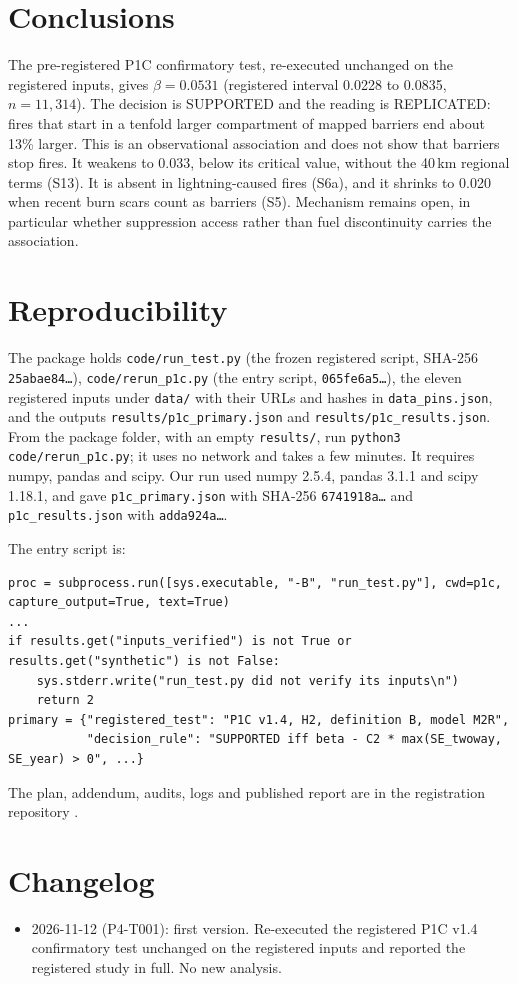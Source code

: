 \documentclass[11pt]{article}
\begin{document}
\section{Conclusions}
The pre-registered P1C confirmatory test, re-executed unchanged on the registered inputs, gives $\beta=0.0531$ (registered interval 0.0228 to 0.0835,
$n=11{,}314$). The decision is SUPPORTED and the reading is REPLICATED: fires that start in a tenfold larger compartment of mapped barriers end about 13\% larger.
This is an observational association and does not show that barriers stop fires. It weakens to 0.033, below its critical value, without the 40\,km
regional terms (S13). It is absent in lightning-caused fires (S6a), and it shrinks to 0.020 when recent burn scars count as barriers (S5).
Mechanism remains open, in particular whether suppression access rather than fuel discontinuity carries the association.

\section{Reproducibility}\label{sec:repro}
{\sloppy
The package holds \texttt{code/run\_test.py} (the frozen registered script, SHA-256 \texttt{25abae84\ldots}), \texttt{code/rerun\_p1c.py}
(the entry script, \texttt{065fe6a5\ldots}), the eleven registered inputs under \texttt{data/} with their URLs and hashes in \texttt{data\_pins.json},
and the outputs \texttt{results/p1c\_primary.json} and \texttt{results/p1c\_results.json}. From the package folder, with an empty \texttt{results/},
run \texttt{python3 code/rerun\_p1c.py}; it uses no network and takes a few minutes. It requires numpy, pandas and scipy. Our run used numpy 2.5.4, pandas 3.1.1 and scipy 1.18.1, and gave
\texttt{p1c\_primary.json} with SHA-256 \texttt{6741918a\ldots} and \texttt{p1c\_results.json} with \texttt{adda924a\ldots}.\par}
The entry script is:
\begin{lstlisting}
proc = subprocess.run([sys.executable, "-B", "run_test.py"], cwd=p1c, capture_output=True, text=True)
...
if results.get("inputs_verified") is not True or results.get("synthetic") is not False:
    sys.stderr.write("run_test.py did not verify its inputs\n")
    return 2
primary = {"registered_test": "P1C v1.4, H2, definition B, model M2R",
           "decision_rule": "SUPPORTED iff beta - C2 * max(SE_twoway, SE_year) > 0", ...}
\end{lstlisting}
The plan, addendum, audits, logs and published report are in the registration repository \citep{ViridisCanonPR138}.

\section*{Changelog}
\begin{itemize}
\item 2026-11-12 (P4-T001): first version. Re-executed the registered P1C v1.4 confirmatory test unchanged on the registered inputs and
  reported the registered study in full. No new analysis.
\end{itemize}



\end{document}
